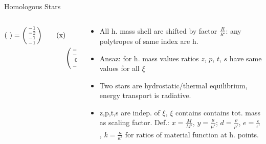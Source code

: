\begin{frame}{Homologous Stars}
\begin{columns}[T]
\begin{column}{0.55\textwidth}
\begin{align*}
\begin{psmallmatrix}
            \end{psmallmatrix}=\begin{psmallmatrix}
                -1\\-2\\-1\\-1\\
            \end{psmallmatrix}\tag{x}\\
            &\begin{psmallmatrix}\setlength\arraycolsep{-10pt}
                -3&-\alpha&\delta&0\\
                -4&-1&0&0\\
                0&\lambda\alpha&(\nu-\lambda\delta)&-1\\
                -4&a&(b-4)&1\\
            \end{psmallmatrix}
            \begin{psmallmatrix}
                z_2\\p_2\\t_2\\s_2\\
            \end{psmallmatrix}=\begin{psmallmatrix}
               \phi\\0\\-\lambda\phi\\0\\
            \end{psmallmatrix}\tag{y}
             \end{align*}
        \end{column}
        \begin{column}{0.45\textwidth}
            \begin{itemize}
                \item All h. mass shell are shifted by factor $\frac{R}{R'}$: any polytropes of same index are h.
                \item Ansaz: for h. mass values ratios $z$, $p$, $t$, $s$ have same values for all $\xi$
                \item Two stars are hydrostatic/thermal equilibrium, energy transport is radiative.
                \item z,p,t,s are indep. of $\xi$, $\xi$ contains contains tot. mass as scaling factor. Def.: $x=\frac{M}{M'}$, $y=\frac{\mu}{\mu'}$; $d=\frac{\rho}{\rho'}$, $e=\frac{\epsilon}{\epsilon'}$, $k=\frac{\kappa}{\kappa'}$ for ratios of material function at h. points.

\end{itemize}
\end{column}
\end{columns}
\end{frame}
